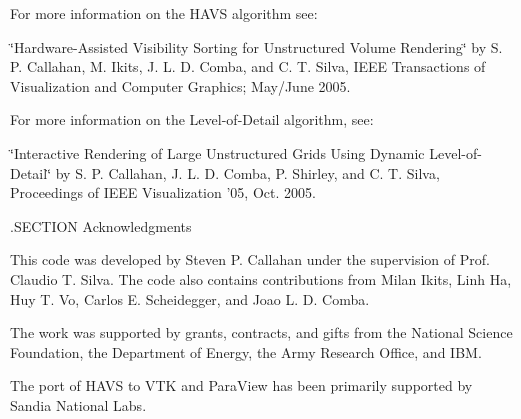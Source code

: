 For more information on the H\-A\-V\-S algorithm see\-:

\char`\"{}\-Hardware-\/\-Assisted Visibility Sorting for Unstructured Volume
 Rendering\char`\"{} by S. P. Callahan, M. Ikits, J. L. D. Comba, and C. T. Silva, I\-E\-E\-E Transactions of Visualization and Computer Graphics; May/\-June 2005.

For more information on the Level-\/of-\/\-Detail algorithm, see\-:

\char`\"{}\-Interactive Rendering of Large Unstructured Grids Using Dynamic
 Level-\/of-\/\-Detail\char`\"{} by S. P. Callahan, J. L. D. Comba, P. Shirley, and C. T. Silva, Proceedings of I\-E\-E\-E Visualization '05, Oct. 2005.

.S\-E\-C\-T\-I\-O\-N Acknowledgments

This code was developed by Steven P. Callahan under the supervision of Prof. Claudio T. Silva. The code also contains contributions from Milan Ikits, Linh Ha, Huy T. Vo, Carlos E. Scheidegger, and Joao L. D. Comba.

The work was supported by grants, contracts, and gifts from the National Science Foundation, the Department of Energy, the Army Research Office, and I\-B\-M.

The port of H\-A\-V\-S to V\-T\-K and Para\-View has been primarily supported by Sandia National Labs.

